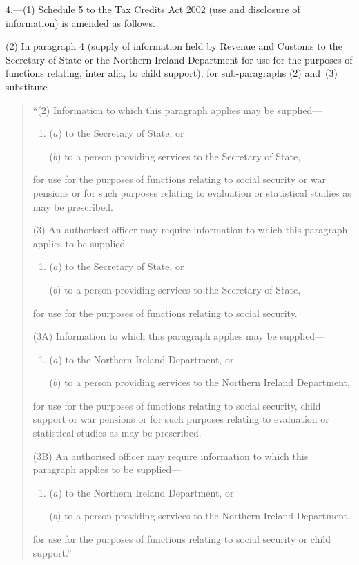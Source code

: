 \documentclass[12pt,a4paper]{article}
\begin{document}
4.---(1) Schedule 5 to the Tax Credits Act 2002 (use and disclosure of information) is amended as follows.

(2) In paragraph 4 (supply of information held by Revenue and Customs to the Secretary of State or the Northern Ireland Department for use for the purposes of functions relating, inter alia, to child support), for sub-paragraphs (2) and~(3) substitute—
\begin{quotation}
“(2) Information to which this paragraph applies may be supplied—
\begin{enumerate}\item[]
($a$) to the Secretary of State, or

($b$) to a person providing services to the Secretary of State,
\end{enumerate}
for use for the purposes of functions relating to social security or war pensions or for such purposes relating to evaluation or statistical studies as may be prescribed.

(3) An authorised officer may require information to which this paragraph applies to be supplied—
\begin{enumerate}\item[]
($a$) to the Secretary of State, or

($b$) to a person providing services to the Secretary of State,
\end{enumerate}
for use for the purposes of functions relating to social security.

(3A) Information to which this paragraph applies may be supplied—
\begin{enumerate}\item[]
($a$) to the Northern Ireland Department, or

($b$) to a person providing services to the Northern Ireland Department,
\end{enumerate}
for use for the purposes of functions relating to social security, child support or war pensions or for such purposes relating to evaluation or statistical studies as may be prescribed.

(3B) An authorised officer may require information to which this paragraph applies to be supplied—
\begin{enumerate}\item[]
($a$) to the Northern Ireland Department, or

($b$) to a person providing services to the Northern Ireland Department,
\end{enumerate}
for use for the purposes of functions relating to social security or child support.”
\end{quotation}
\end{document}
